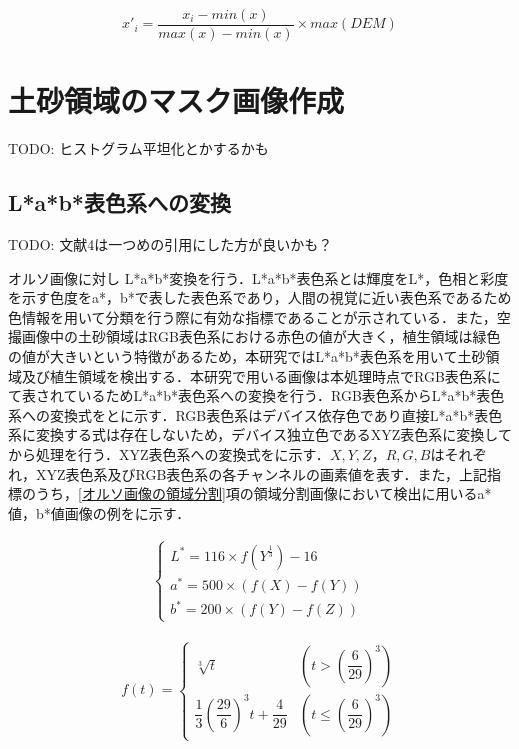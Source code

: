       \begin{equation}
        \label{正規化}
        x'_{i} = \dfrac{x_{i} - min(x)} {max(x) - min(x)} \times max(DEM) 
      \end{equation}


  \section{土砂領域のマスク画像作成}
    \label{土砂マスク}
      TODO: ヒストグラム平坦化とかするかも

    \subsection{L*a*b*表色系への変換}
    TODO: 文献4は一つめの引用にした方が良いかも？

      オルソ画像に対し L*a*b*変換\cite{Lab表色系1}を行う．L*a*b*表色系とは輝度をL*，色相と彩度を示す色度をa*，b*で表した表色系であり，人間の視覚に近い表色系であるため色情報を用いて分類を行う際に有効な指標であることが示されている．また，空撮画像中の土砂領域はRGB表色系における赤色の値が大きく，植生領域は緑色の値が大きいという特徴があるため，本研究ではL*a*b*表色系を用いて土砂領域及び植生領域を検出する\cite{Lab表色系2, Lab表色系3, Lab表色系4}．本研究で用いる画像は本処理時点でRGB表色系にて表されているためL*a*b*表色系への変換を行う．RGB表色系からL*a*b*表色系への変換式をとに示す．RGB表色系はデバイス依存色であり直接L*a*b*表色系に変換する式は存在しないため，デバイス独立色であるXYZ表色系\cite{XYZ表色系}に変換してから処理を行う．XYZ表色系への変換式をに示す．$X,Y,Z$，$R,G,B$はそれぞれ，XYZ表色系及びRGB表色系の各チャンネルの画素値を表す．また，上記指標のうち，\ref{オルソ画像の領域分割}項の領域分割画像において検出に用いるa*値，b*値画像の例をに示す．

      \begin{eqnarray}
      \label{Lab表色系1}
        \left\{
          \begin{array}{l}
            L^* = 116 \times f(Y^{\frac{1}{3}}) - 16 \\
            a^* = 500 \times (f(X) - f(Y)) \\
            b^* = 200 \times (f(Y) - f(Z))
          \end{array}
        \right.
      \end{eqnarray}

      \begin{eqnarray}
        \label{Lab表色系2}
          f(t) = 
          \left\{
            \begin{array}{lll}
              \sqrt[3]{t} 
                &(t >    (\dfrac{6} {29})^3) \\
              \dfrac{1} {3} (\dfrac{29} {6})^3 t + \dfrac{4} {29}
                &(t \leq (\dfrac{6} {29})^3)
            \end{array}
          \right.
      \end{eqnarray}

